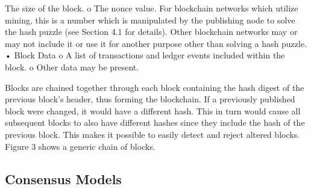 The size of the block.
o The nonce value. For blockchain networks which utilize mining, this is a number
which is manipulated by the publishing node to solve the hash puzzle (see Section
4.1 for details). Other blockchain networks may or may not include it or use it for
another purpose other than solving a hash puzzle.
• Block Data
o A list of transactions and ledger events included within the block.
o Other data may be present.

 Blocks are chained together through each block containing the hash digest of the previous block’s header, thus forming the
blockchain. If a previously published block were changed, it would have a different hash. This in turn would cause all subsequent
blocks to also have different hashes since they include the hash of the previous block. This makes it possible to easily detect and reject
altered blocks. Figure 3 shows a generic chain of blocks.

\subsection{Consensus Models}
